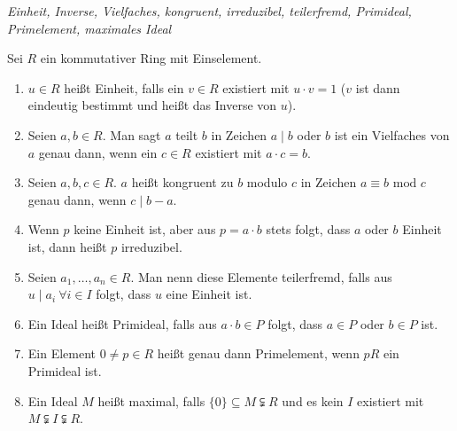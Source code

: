 \begin{mydef} \textit{Einheit, Inverse, Vielfaches, kongruent, irreduzibel, teilerfremd, Primideal, Primelement, maximales Ideal}

    Sei $R$ ein kommutativer Ring mit Einselement.
    \begin{enumerate}
        \item $u \in R$ heißt Einheit, falls ein $v \in R$ existiert mit $u \cdot v = 1$ ($v$ ist dann eindeutig bestimmt und heißt das Inverse von $u$).
        \item Seien $a, b \in R$. Man sagt $a$ teilt $b$ in Zeichen $a \mid b$ oder $b$ ist ein Vielfaches von $a$ genau dann, wenn ein $c \in R$ existiert mit $a \cdot c = b$.
        \item Seien $a, b, c \in R$. $a$ heißt kongruent zu $b$ modulo $c$ in Zeichen $a \equiv b \mbox{ mod }c$ genau dann, wenn $c \mid b-a$.
        \item Wenn $p$ keine Einheit ist, aber aus $p = a \cdot b$ stets folgt, dass $a$ oder $b$ Einheit ist, dann heißt $p$ irreduzibel.
        \item Seien $a_1, \ldots ,a_n \in R$. Man nenn diese Elemente teilerfremd, falls aus $u \mid a_i \ \forall i \in I$ folgt, dass $u$ eine Einheit ist.
        \item Ein Ideal heißt Primideal, falls aus $a \cdot b \in P$ folgt, dass $a \in P$ oder $b \in P$ ist.
        \item Ein Element $0 \neq p \in R$ heißt genau dann Primelement, wenn $pR$ ein Primideal ist.
        \item Ein Ideal $M$ heißt maximal, falls $\{ 0 \}\subseteq M \subsetneqq R$ und es kein $I$ existiert mit $M \subsetneqq I \subsetneqq R$.
    \end{enumerate}
\end{mydef}


